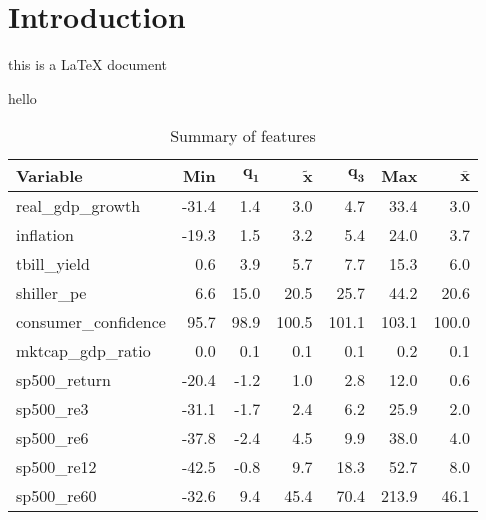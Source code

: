 \documentclass{article}
\begin{document}

\section{Introduction}

\begin{center}
    {\Huge this is a {\LaTeX}  document}
\end{center}

hello

% 

% 

\begin{table}[ht]
    \centering
    \begingroup\footnotesize
    \begin{tabular}{lrrrrrr}
     \textbf{Variable} & \textbf{Min} & $\mathbf{q_1}$ & $\mathbf{\widetilde{x}}$ & $\mathbf{q_3}$ & \textbf{Max} & $\mathbf{\bar{x}}$ \\ 
      \hline
    real\_gdp\_growth & -31.4 &  1.4 &   3.0 &   4.7 &  33.4 &   3.0 \\ 
      inflation & -19.3 &  1.5 &   3.2 &   5.4 &  24.0 &   3.7 \\ 
      tbill\_yield &   0.6 &  3.9 &   5.7 &   7.7 &  15.3 &   6.0 \\ 
      shiller\_pe &   6.6 & 15.0 &  20.5 &  25.7 &  44.2 &  20.6 \\ 
      consumer\_confidence &  95.7 & 98.9 & 100.5 & 101.1 & 103.1 & 100.0 \\ 
      mktcap\_gdp\_ratio &   0.0 &  0.1 &   0.1 &   0.1 &   0.2 &   0.1 \\ 
      sp500\_return & -20.4 & -1.2 &   1.0 &   2.8 &  12.0 &   0.6 \\ 
      sp500\_re3 & -31.1 & -1.7 &   2.4 &   6.2 &  25.9 &   2.0 \\ 
      sp500\_re6 & -37.8 & -2.4 &   4.5 &   9.9 &  38.0 &   4.0 \\ 
      sp500\_re12 & -42.5 & -0.8 &   9.7 &  18.3 &  52.7 &   8.0 \\ 
      sp500\_re60 & -32.6 &  9.4 &  45.4 &  70.4 & 213.9 &  46.1 \\ 
      \end{tabular}
    \endgroup
    \caption{Summary of features} 
    \label{tab:features}
    \end{table}
\end{document}
